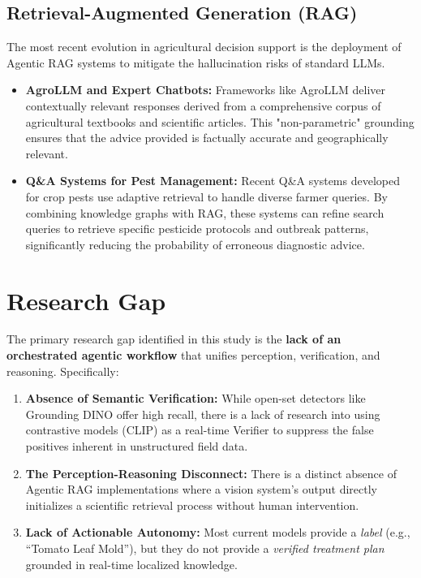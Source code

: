 \subsection{Retrieval-Augmented Generation (RAG)}
The most recent evolution in agricultural decision support is the deployment of Agentic RAG systems to mitigate the hallucination risks of standard LLMs.
\begin{itemize}
	\item \textbf{AgroLLM and Expert Chatbots:} Frameworks like AgroLLM \cite{agrollm2024} deliver contextually relevant responses derived from a comprehensive corpus of agricultural textbooks and scientific articles. This "non-parametric" grounding ensures that the advice provided is factually accurate and geographically relevant.
	\item \textbf{Q\&A Systems for Pest Management:} Recent Q\&A systems developed for crop pests use adaptive retrieval to handle diverse farmer queries. By combining knowledge graphs with RAG, these systems can refine search queries to retrieve specific pesticide protocols and outbreak patterns, significantly reducing the probability of erroneous diagnostic advice.
\end{itemize}



%


\section{Research Gap}
The primary research gap identified in this study is the \textbf{lack of an orchestrated agentic workflow} that unifies perception, verification, and reasoning. Specifically:
\begin{enumerate}
	\item \textbf{Absence of Semantic Verification:} While open-set detectors like Grounding DINO offer high recall, there is a lack of research into using contrastive models (CLIP) as a real-time Verifier to suppress the false positives inherent in unstructured field data.
	\item \textbf{The Perception-Reasoning Disconnect:} There is a distinct absence of Agentic RAG implementations where a vision system's output directly initializes a scientific retrieval process without human intervention.
	\item \textbf{Lack of Actionable Autonomy:} Most current models provide a \textit{label} (e.g., ``Tomato Leaf Mold''), but they do not provide a \textit{verified treatment plan} grounded in real-time localized knowledge.
\end{enumerate}

